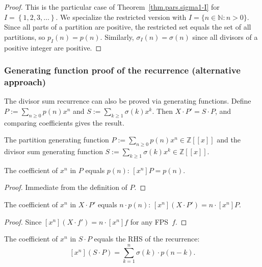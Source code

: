 \begin{proof}
This is the particular case of Theorem~\ref{thm.pars.sigma1-I} for $I=\left\{  1,2,3,\ldots\right\}$.
We specialize the restricted version with $I = \{n \in \mathbb{N} : n > 0\}$.
Since all parts of a partition are positive, the restricted set equals the set of all partitions,
so $p_I(n) = p(n)$. Similarly, $\sigma_I(n) = \sigma(n)$ since all divisors of a positive integer
are positive.
\end{proof}

\subsubsection{Generating function proof of the recurrence (alternative approach)}

The divisor sum recurrence can also be proved via generating functions.
Define $P := \sum_{n\ge 0} p(n) x^n$ and $S := \sum_{k\ge 1} \sigma(k) x^k$.
Then $X\cdot P' = S\cdot P$, and comparing coefficients gives the result.

\begin{definition}
\label{def.pars.genFun-P-S}
\leanhelper
\leanok
The partition generating function $P := \sum_{n\ge 0} p(n) x^n \in \mathbb{Z}[[x]]$
and the divisor sum generating function $S := \sum_{k\ge 1} \sigma(k) x^k \in \mathbb{Z}[[x]]$.
\end{definition}

\begin{lemma}
\label{lem.pars.coeff-P}
\leanhelper
\leanok
The coefficient of $x^n$ in $P$ equals $p(n)$: $[x^n]P = p(n)$.
\end{lemma}

\begin{proof}
\leanok
Immediate from the definition of $P$.
\end{proof}

\begin{lemma}
\label{lem.pars.coeff-X-mul-derivative-P}
\leanhelper
\leanok
The coefficient of $x^n$ in $X\cdot P'$ equals $n\cdot p(n)$:
$[x^n](X \cdot P') = n \cdot [x^n]P$.
\end{lemma}

\begin{proof}
\leanok
Since $[x^n](X\cdot f') = n\cdot[x^n]f$ for any FPS~$f$.
\end{proof}

\begin{lemma}
\label{lem.pars.coeff-S-mul-P}
\leanhelper
\leanok
The coefficient of $x^n$ in $S\cdot P$ equals the RHS of the recurrence:
\[
[x^n](S\cdot P) = \sum_{k=1}^{n} \sigma(k)\cdot p(n-k).
\]
\end{lemma}

